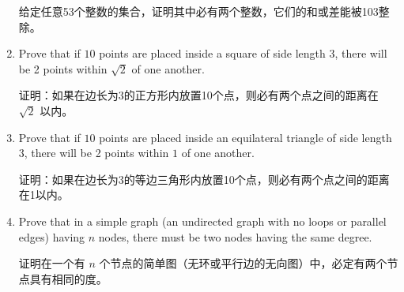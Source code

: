 \begin{enumerate}
    \noindent 给定任意53个整数的集合，证明其中必有两个整数，它们的和或差能被103整除。
    \wbvfill
    
    \workbookpagebreak
    
    \item Prove that if $10$ points are placed inside a square of side length 3,
    there will be 2 points within $\sqrt{2}$ of one another.
    
    \noindent 证明：如果在边长为3的正方形内放置10个点，则必有两个点之间的距离在 $\sqrt{2}$ 以内。
    \wbvfill
    
    \item Prove that if $10$ points are placed inside an equilateral triangle
    of side length 3, there will be 2 points within $1$ of one another.
    
    \noindent 证明：如果在边长为3的等边三角形内放置10个点，则必有两个点之间的距离在1以内。
    \wbvfill
    
    \workbookpagebreak
    
    \item Prove that in a simple graph (an undirected graph with no 
    loops or parallel edges) having $n$ nodes, there must be two nodes 
    having the same degree.
    
    \noindent 证明在一个有 $n$ 个节点的简单图（无环或平行边的无向图）中，必定有两个节点具有相同的度。
    \wbvfill
    
    \workbookpagebreak
    
    \end{enumerate}
    
    
